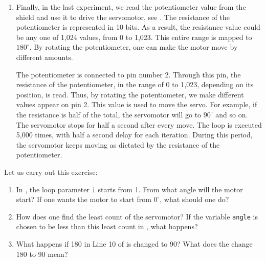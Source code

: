 \begin{enumerate}
\item Finally, in the last experiment, we read the potentiometer value
  from the shield and use it to drive the servomotor, see
  .  The resistance of the potentiometer is
  represented in 10 bits.  As a result, the resistance value could be
  any one of 1,024 values, from 0 to 1,023.  This entire range is
  mapped to $180^\circ$.  By rotating the potentiometer, one can make
  the motor move by different amounts.

  The potentiometer is connected to pin number 2.  Through this pin,
  the resistance of the potentiometer, in the range of 0 to 1,023,
  depending on its position, is read.  Thus, by rotating the
  potentiometer, we make different values appear on pin 2.  This value
  is used to move the servo.  For example, if the resistance is half
  of the total, the servomotor will go to $90^\circ$ and so on.  The
  servomotor stops for half a second after every move.  The loop is
  executed 5,000 times, with half a second delay for each iteration.
  During this period, the servomotor keeps moving as dictated by the
  resistance of the potentiometer.

\end{enumerate}

\begin{exercise}
Let us carry out this exercise:
\begin{enumerate}
\item In , the loop parameter {\tt i} starts
  from 1.  From what angle will the motor start?  If one wants the
  motor to start from $0^\circ$, what should one do?
\item How does one find the least count of the servomotor?  If the
  variable {\tt angle} is chosen to be less than this least count in
  , what happens?
\item What happens if 180 in Line 10 of  is
  changed to 90?  What does the change 180 to 90 mean?
\end{enumerate}
\end{exercise}

